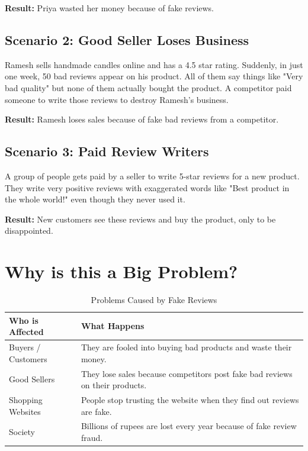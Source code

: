 \documentclass[10pt, a4paper]{report}
\begin{document}
\textbf{Result:} Priya wasted her money because of fake reviews.

\subsection{Scenario 2: Good Seller Loses Business}

Ramesh sells handmade candles online and has a 4.5 star rating. Suddenly, in just one week, 50 bad reviews appear on his product. All of them say things like "Very bad quality" but none of them actually bought the product. A competitor paid someone to write those reviews to destroy Ramesh's business.

\textbf{Result:} Ramesh loses sales because of fake bad reviews from a competitor.

\subsection{Scenario 3: Paid Review Writers}

A group of people gets paid by a seller to write 5-star reviews for a new product. They write very positive reviews with exaggerated words like "Best product in the whole world!" even though they never used it.

\textbf{Result:} New customers see these reviews and buy the product, only to be disappointed.

\section{Why is this a Big Problem?}

\begin{table}[H]
\centering
\caption{Problems Caused by Fake Reviews}
\begin{tabularx}{\textwidth}{lX}
\toprule
\textbf{Who is Affected} & \textbf{What Happens} \\
\midrule
Buyers / Customers & They are fooled into buying bad products and waste their money. \\
Good Sellers & They lose sales because competitors post fake bad reviews on their products. \\
Shopping Websites & People stop trusting the website when they find out reviews are fake. \\
Society & Billions of rupees are lost every year because of fake review fraud. \\
\bottomrule
\end{tabularx}
\end{table}
\end{document}
